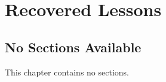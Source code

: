 \documentclass[../Main.tex]{subfiles}
\begin{document}
\chapter{ Recovered Lessons }


\section{No Sections Available}
This chapter contains no sections.
\end{document}
